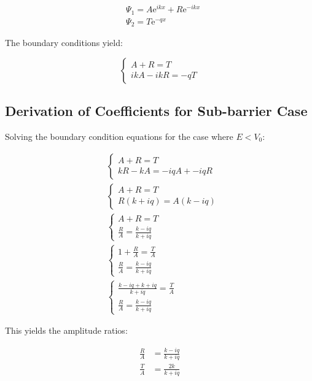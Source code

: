 \documentclass[italian]{HKNdocument}
\begin{document}
\begin{align}
& \Psi_{1}=A \mathrm{e}^{i k x}+R \mathrm{e}^{-i k x} \\
& \Psi_{2}=T \mathrm{e}^{-q x}
\end{align}

The boundary conditions yield:

\[
\left\{\begin{array}{l}
A+R=T  \\
i k A-i k R=-q T
\end{array}\right.
\]


\subsection{Derivation of Coefficients for Sub-barrier Case}

Solving the boundary condition equations for the case where $E<V_0$:

\begin{align}
& \left\{\begin{array}{l}
A+R=T \\
k R-k A=-i q A+-i q R
\end{array}\right. \\
& \left\{\begin{array}{l}
A+R=T \\
R(k+i q)=A(k-i q)
\end{array}\right. \\
& \left\{\begin{array}{l}
A+R=T \\
\frac{R}{A}=\frac{k-i q}{k+i q}
\end{array}\right.  \\
& \left\{\begin{array}{l}
1+\frac{R}{A}=\frac{T}{A} \\
\frac{R}{A}=\frac{k-i q}{k+i q}
\end{array}\right. \\
& \left\{\begin{array}{l}
\frac{k-i q+k+i q}{k+i q}=\frac{T}{A} \\
\frac{R}{A}=\frac{k-i q}{k+i q}
\end{array}\right.
\end{align}

This yields the amplitude ratios:

\begin{align}
\frac{R}{A} & =\frac{k-i q}{k+i q} \\
\frac{T}{A} & =\frac{2 k}{k+i q}
\end{align}
\end{document}
